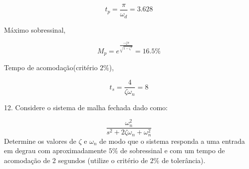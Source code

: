 \documentclass[paper=a4, fontsize=11pt]{article}
\begin{document}
$$
t_p = \frac{\pi}{\omega_d} = 3.628
$$

Máximo sobressinal,

$$
M_p = e^{\frac{-\zeta \pi}{\sqrt{1-\zeta^2}} } = 16.5 \%
$$

Tempo de acomodação(critério $2\%$),

$$
t_s = \frac{4}{\zeta \omega_n} = 8
$$


\newpage

12. Considere o sistema de malha fechada dado como:

$$
\frac{\omega_n^2}{s^2 + 2 \zeta \omega_n + \omega_n^2}
$$
Determine os valores de $\zeta$ e $\omega_n$ de modo que o sistema responda a uma entrada em degrau
com aproximadamente $5\%$ de sobressinal e com um tempo de acomodação de 2 segundos
(utilize o critério de $2\%$ de tolerância).
\end{document}
